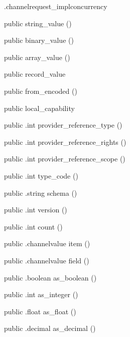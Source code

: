 \begin{CrexxClass}{.channelrequest\_impl}{concurrency}
\begin{Members}
    \Factory
      {public}
      {string\_value}
      {()}

    \Factory
      {public}
      {binary\_value}
      {()}

    \Factory
      {public}
      {array\_value}
      {()}

    \Factory
      {public}
      {record\_value}
      {}

    \Factory
      {public}
      {from\_encoded}
      {()}

    \Factory
      {public}
      {local\_capability}
      {}

    \Method
      {public}
      {.int}
      {provider\_reference\_type}
      {()}

    \Method
      {public}
      {.int}
      {provider\_reference\_rights}
      {()}

    \Method
      {public}
      {.int}
      {provider\_reference\_scope}
      {()}

    \Method
      {public}
      {.int}
      {type\_code}
      {()}

    \Method
      {public}
      {.string}
      {schema}
      {()}

    \Method
      {public}
      {.int}
      {version}
      {()}

    \Method
      {public}
      {.int}
      {count}
      {()}

    \Method
      {public}
      {.channelvalue}
      {item}
      {()}

    \Method
      {public}
      {.channelvalue}
      {field}
      {()}

    \Method
      {public}
      {.boolean}
      {as\_boolean}
      {()}

    \Method
      {public}
      {.int}
      {as\_integer}
      {()}

    \Method
      {public}
      {.float}
      {as\_float}
      {()}

    \Method
      {public}
      {.decimal}
      {as\_decimal}
      {()}


\end{Members}
\end{CrexxClass}
